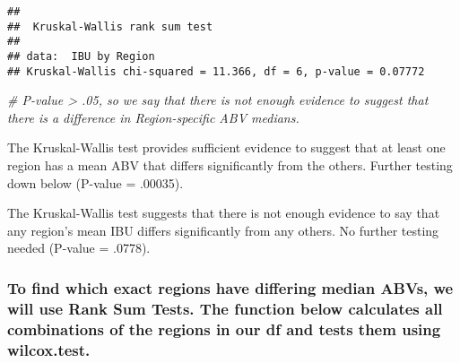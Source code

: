 \documentclass[
]{article}
\newenvironment{Shaded}{\begin{snugshade}}{\end{snugshade}}
\newcommand{\CommentTok}[1]{\textcolor[rgb]{0.56,0.35,0.01}{\textit{#1}}}
\begin{document}
\begin{verbatim}
## 
##  Kruskal-Wallis rank sum test
## 
## data:  IBU by Region
## Kruskal-Wallis chi-squared = 11.366, df = 6, p-value = 0.07772
\end{verbatim}

\begin{Shaded}
\begin{Highlighting}[]
\CommentTok{\# P{-}value \textgreater{} .05, so we say that there is not enough evidence to suggest that there is a difference in Region{-}specific ABV medians.}
\end{Highlighting}
\end{Shaded}

The Kruskal-Wallis test provides sufficient evidence to suggest that at
least one region has a mean ABV that differs significantly from the
others. Further testing down below (P-value = .00035).

The Kruskal-Wallis test suggests that there is not enough evidence to
say that any region's mean IBU differs significantly from any others. No
further testing needed (P-value = .0778).

\hypertarget{to-find-which-exact-regions-have-differing-median-abvs-we-will-use-rank-sum-tests.-the-function-below-calculates-all-combinations-of-the-regions-in-our-df-and-tests-them-using-wilcox.test.}{%
\subsubsection{To find which exact regions have differing median ABVs,
we will use Rank Sum Tests. The function below calculates all
combinations of the regions in our df and tests them using
wilcox.test.}\label{to-find-which-exact-regions-have-differing-median-abvs-we-will-use-rank-sum-tests.-the-function-below-calculates-all-combinations-of-the-regions-in-our-df-and-tests-them-using-wilcox.test.}}
\end{document}
